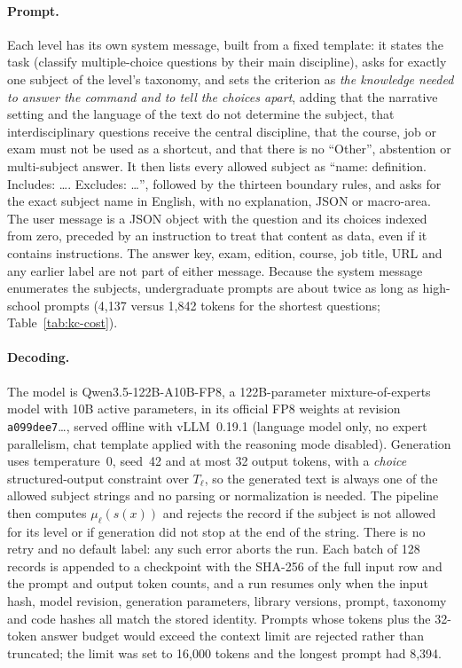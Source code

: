 \paragraph{Prompt.} Each level has its own system message, built from a
fixed template: it states the task (classify multiple-choice questions by
their main discipline), asks for exactly one subject of the level's
taxonomy, and sets the criterion as \emph{the knowledge needed to answer the
command and to tell the choices apart}, adding that the narrative setting
and the language of the text do not determine the subject, that
interdisciplinary questions receive the central discipline, that the course,
job or exam must not be used as a shortcut, and that there is no ``Other'',
abstention or multi-subject answer. It then lists every allowed subject as
``name: definition. Includes: \ldots. Excludes: \ldots'', followed by the
thirteen boundary rules, and asks for the exact subject name in English, with
no explanation, JSON or macro-area. The user message is a JSON object with
the question and its choices indexed from zero, preceded by an instruction
to treat that content as data, even if it contains instructions. The
answer key, exam, edition, course, job title, URL and any earlier label are
not part of either message. Because the system message enumerates the
subjects, undergraduate prompts are about twice as long as high-school
prompts (4,137 versus 1,842 tokens for the shortest questions;
Table~\ref{tab:kc-cost}).

\paragraph{Decoding.} The model is Qwen3.5-122B-A10B-FP8, a 122B-parameter
mixture-of-experts model with 10B active parameters, in its official FP8
weights at revision \texttt{a099dee7}\ldots, served offline with
vLLM~0.19.1 (language model only, no expert parallelism, chat template
applied with the reasoning mode disabled). Generation uses temperature~0,
seed~42 and at most 32 output tokens, with a \emph{choice} structured-output
constraint over $T_\ell$, so the generated text is always one of the allowed
subject strings and no parsing or normalization is needed. The pipeline
then computes $\mu_\ell(s(x))$ and rejects the record if the subject is not
allowed for its level or if generation did not stop at the end of the
string. There is no retry and no default label: any such error aborts the
run. Each batch of 128 records is appended to a checkpoint with the SHA-256
of the full input row and the prompt and output token counts, and a run
resumes only when the input hash, model revision, generation parameters,
library versions, prompt, taxonomy and code hashes all match the stored
identity. Prompts whose tokens plus the 32-token answer budget would exceed
the context limit are rejected rather than truncated; the limit was set to
16,000 tokens and the longest prompt had 8,394.

